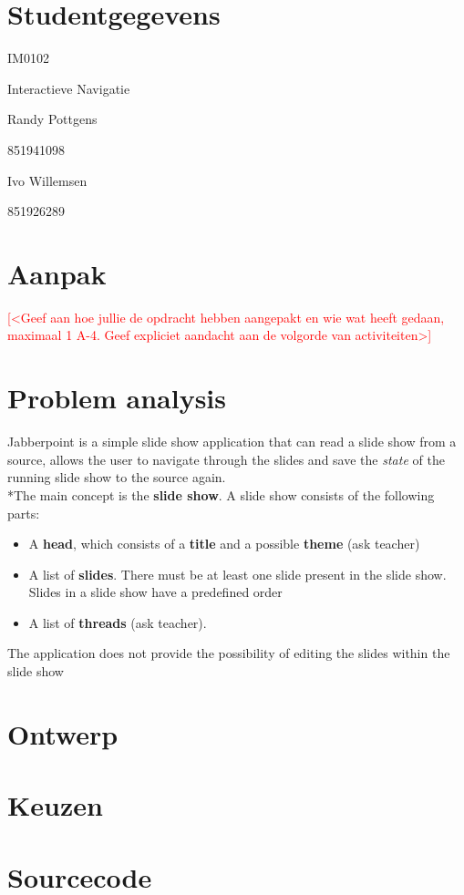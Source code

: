 \documentclass[a4paper]{article}
\newcommand{\todo}[1]{\textcolor{red}{[#1]}}
\begin{document}
\pagestyle{fancy}

\section*{Studentgegevens}
\begin{description}
	\item [Cursuscode] IM0102
	\item Interactieve Navigatie
	\item [Naam]Randy Pottgens
	\item [Studentnummer]851941098
	\item [Naam]Ivo Willemsen
	\item [Studentnummer]851926289
\end{description}

\section*{Aanpak}
\todo{<Geef aan hoe jullie de opdracht hebben aangepakt en wie wat heeft gedaan, maximaal 1 A-4. Geef expliciet aandacht aan de volgorde van activiteiten>}



\section{Problem analysis}
Jabberpoint is a simple slide show application that can read a slide show from a source, allows the user to navigate through the slides and save the \textit{state} of the running slide show to the source again.
\\*The main concept is the \textbf{slide show}. A slide show consists of the following parts:
\begin{itemize}
\item A \textbf{head}, which consists of a \textbf{title} and a possible \textbf{theme} (ask teacher)
\item A list of \textbf{slides}. There must be at least one slide present in the slide show. Slides in a slide show have a predefined order
\item A list of \textbf{threads} (ask teacher). 
\end{itemize}
The application does not provide the possibility of editing the slides within the slide show


\section{Ontwerp}


\section{Keuzen}



\section{Sourcecode}
\end{document}
